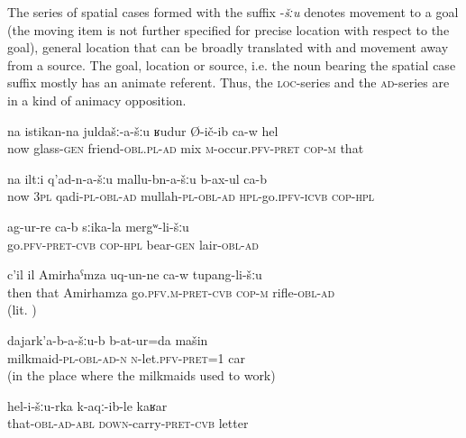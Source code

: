 The series of spatial cases formed with the suffix -\textit{šːu} denotes movement to a goal (the moving item is not further specified for precise location with respect to the goal), general location that can be broadly translated with  and movement away from a source. The goal, location or source, i.e. the noun bearing the spatial case suffix mostly has an animate referent. Thus, the \textsc{loc}-series and the \textsc{ad}-series are in a kind of animacy opposition. 
%
\begin{exe}
	\ex	\label{ex:He mingled with his drinking friends}
	\gll	na	istikan-na	juldašː-a-šːu	ʁudur	Ø-ič-ib ca-w	hel\\
		now	glass-\textsc{gen}	friend-\textsc{obl}.\textsc{pl}-\textsc{ad}	mix	\textsc{m}-occur.\textsc{pfv}-\textsc{pret} \textsc{cop-m}	that\\
	\glt	{}
	
	\ex	\label{ex:They go to the qadis, to the mullahs}
	\gll	na	iltːi	q'ad-n-a-šːu	mallu-bn-a-šːu	b-ax-ul ca-b \\
		now	3\textsc{pl}	qadi-\textsc{pl}-\textsc{obl}-\textsc{ad}	mullah-\textsc{pl}-\textsc{obl}-\textsc{ad}	\textsc{hpl}-go.\textsc{ipfv}-\textsc{icvb} \textsc{cop-hpl}\\
	\glt	{}
	
	\ex	\label{ex:They went to the cave of the bear}
	\gll	ag-ur-re ca-b	sːika-la	mergʷ-li-šːu \\
		go.\textsc{pfv}-\textsc{pret}-\textsc{cvb} \textsc{cop-hpl}	bear-\textsc{gen}	lair-\textsc{obl}-\textsc{ad}\\
	\glt	{}
	
	\ex	\label{ex:Then Amirhamza took a rifle}
	\gll	c'il	il	Amirħaˁmza	uq-un-ne ca-w	tupang-li-šːu\\
		then	that	Amirhamza	go.\textsc{pfv.m}-\textsc{pret}-\textsc{cvb} \textsc{cop-m} rifle-\textsc{obl}-\textsc{ad}\\
	\glt	{} (lit. )
	
	\ex	\label{ex:(We) left the car with the milkmaids}
	\gll	dajark'a-b-a-šːu-b	b-at-ur=da	mašin\\
		milkmaid-\textsc{pl}-\textsc{obl}-\textsc{ad}-\textsc{n}	\textsc{n}-let.\textsc{pfv}-\textsc{pret}=1	car\\
	\glt	{} (in the place where the milkmaids used to work)
	
	\ex	\label{ex:From him (they) brought a permission}
	\gll	hel-i-šːu-rka	k-aqː-ib-le	kaʁar\\
		that-\textsc{obl}-\textsc{ad}-\textsc{abl}	\textsc{down}-carry-\textsc{pret}-\textsc{cvb}	letter\\
	\glt	{}
\end{exe}


